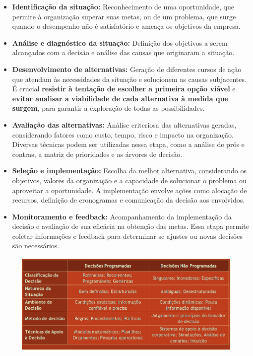 \begin{itemize}
    \item \textbf{Identificação da situação:} Reconhecimento de uma oportunidade, que permite à organização superar suas metas, ou de um problema, que surge quando o desempenho não é satisfatório e ameaça os objetivos da empresa.
    \item \textbf{Análise e diagnóstico da situação:} Definição dos objetivos a serem alcançados com a decisão e análise das causas que originaram a situação.
    \item \textbf{Desenvolvimento de alternativas:} Geração de diferentes cursos de ação que atendam às necessidades da situação e solucionem as causas subjacentes. É crucial \textbf{resistir à tentação de escolher a primeira opção viável} e \textbf{evitar analisar a viabilidade de cada alternativa à medida que surgem}, para garantir a exploração de todas as possibilidades.
    \item \textbf{Avaliação das alternativas:} Análise criteriosa das alternativas geradas, considerando fatores como custo, tempo, risco e impacto na organização. Diversas técnicas podem ser utilizadas nessa etapa, como a análise de prós e contras, a matriz de prioridades e as árvores de decisão.
    \item \textbf{Seleção e implementação:} Escolha da melhor alternativa, considerando os objetivos, valores da organização e a capacidade de solucionar o problema ou aproveitar a oportunidade. A implementação envolve ações como alocação de recursos, definição de cronogramas e comunicação da decisão aos envolvidos.
    \item \textbf{Monitoramento e feedback:} Acompanhamento da implementação da decisão e avaliação de sua eficácia na obtenção das metas. Essa etapa permite coletar informações e feedback para determinar se ajustes ou novas decisões são necessários.
\end{itemize}

\begin{figure}[H]
    \centering
    \begin{minipage}{0.8\textwidth}
        \centering
        \includegraphics[width=\textwidth]{img/imagem6.png}
        \label{fig:exemplo2}
    \end{minipage}
\end{figure}

